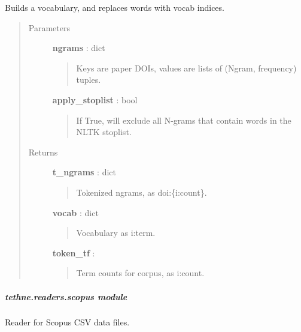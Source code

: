 \documentclass[letterpaper,10pt,english]{sphinxmanual}
\begin{document}

\begin{fulllineitems}
\label{tethne.readers.dfr:tethne.readers.dfr.tokenize}
Builds a vocabulary, and replaces words with vocab indices.
\begin{quote}\begin{description}
\item[{Parameters}] \leavevmode
\textbf{ngrams} : dict
\begin{quote}

Keys are paper DOIs, values are lists of (Ngram, frequency) tuples.
\end{quote}

\textbf{apply\_stoplist} : bool
\begin{quote}

If True, will exclude all N-grams that contain words in the NLTK
stoplist.
\end{quote}

\item[{Returns}] \leavevmode
\textbf{t\_ngrams} : dict
\begin{quote}

Tokenized ngrams, as doi:\{i:count\}.
\end{quote}

\textbf{vocab} : dict
\begin{quote}

Vocabulary as i:term.
\end{quote}

\textbf{token\_tf} : 
\begin{quote}

Term counts for corpus, as i:count.
\end{quote}

\end{description}\end{quote}

\end{fulllineitems}



\subparagraph{tethne.readers.scopus module}
\label{tethne.readers.scopus:module-tethne.readers.scopus}\label{tethne.readers.scopus::doc}\label{tethne.readers.scopus:tethne-readers-scopus-module}
Reader for Scopus CSV data files.
\end{document}
